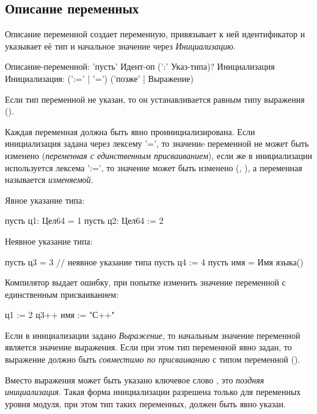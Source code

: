 \hypertarget{variables}{%
\subsection{Описание переменных}\label{decls:variables}}

Описание переменной создает переменную, привязывает к ней идентификатор и указывает её тип и начальное значение через \emph{Инициализацию}. 

\begin{Grammar}
Описание-переменной: 
    'пусть' Идент-оп (':' Указ-типа)? Инициализация
Инициализация: (':=' | '=') ('позже' | Выражение)
\end{Grammar} 

Если тип переменной не указан, то он устанавливается равным типу выражения ().

Каждая переменная должна быть явно проинициализирована.
Если инициализация задана через лексему '=', то значениe переменной не может быть изменено (\emph{переменная с единственным присваиванием}), 
если же в инициализации используется лексема ':=', то значение может быть изменено (, ), а переменная называется \emph{изменяемой}.

Явное указание типа:
\begin{Trivil}[vspace=2pt]
пусть ц1: Цел64 = 1 
пусть ц2: Цел64 := 2
\end{Trivil}

Неявное указание типа:
\begin{Trivil}[vspace=2pt]
пусть ц3 = 3   // неявное указание типа
пусть ц4 := 4
пусть имя = Имя языка() 
\end{Trivil}

Компилятор выдает ошибку, при попытке изменить значение переменной с единственным присваиванием:
\begin{SampleErr}[vspace=2pt]
    ц1 := 2 
    ц3++
    имя := "С++"
\end{SampleErr}

Если в инициализации задано \emph{Выражение}, то начальным значение переменной является значение выражения.
Если при этом тип переменной явно задан, то выражение должно быть \emph{совместимо по присваиванию} с типом переменной ().

Вместо выражения может быть указано ключевое слово , это \emph{поздняя инициализация}. 
Такая форма инициализации разрешена только для переменных уровня модуля, при этом тип таких переменных, должен быть явно указан.

